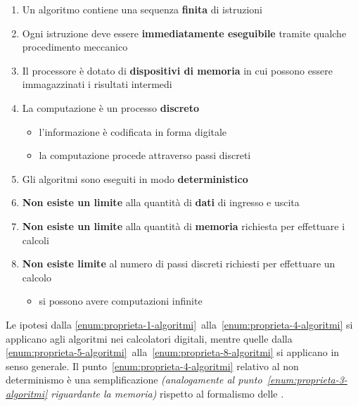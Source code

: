 \documentclass[italian, 10pt]{article}
\begin{document}
\begin{enumerate}[label=\Alph*), ref=(\Alph*)]
  \item \label{enum:proprieta-1-algoritmi} Un algoritmo contiene una sequenza \textbf{finita} di istruzioni
  \item Ogni istruzione deve essere \textbf{immediatamente eseguibile} tramite qualche procedimento meccanico
  \item  \label{enum:proprieta-3-algoritmi} Il processore è dotato di \textbf{dispositivi di memoria} in cui possono essere immagazzinati i risultati intermedi
  \item \label{enum:proprieta-4-algoritmi} La computazione è un processo \textbf{discreto}
        \begin{itemize}[label=\(\rightarrow\)]
          \item l'informazione è codificata in forma digitale
          \item la computazione procede attraverso passi discreti
        \end{itemize}
  \item \label{enum:proprieta-5-algoritmi} Gli algoritmi sono eseguiti in modo \textbf{deterministico}
  \item \label{enum:proprieta-6-algoritmi} \textbf{Non esiste un limite} alla quantità di \textbf{dati} di ingresso e uscita
  \item \label{enum:proprieta-7-algoritmi} \textbf{Non esiste un limite} alla quantità di \textbf{memoria} richiesta per effettuare i calcoli
  \item \label{enum:proprieta-8-algoritmi} \textbf{Non esiste limite} al numero di passi discreti richiesti per effettuare un calcolo
        \begin{itemize}[label=\(\rightarrow\)]
          \item si possono avere computazioni infinite
        \end{itemize}
\end{enumerate}

Le ipotesi dalla \ref{enum:proprieta-1-algoritmi}~alla~\ref{enum:proprieta-4-algoritmi} si applicano agli algoritmi nei calcolatori digitali, mentre quelle dalla \ref{enum:proprieta-5-algoritmi}~alla~\ref{enum:proprieta-8-algoritmi} si applicano in senso generale.
Il punto~\ref{enum:proprieta-4-algoritmi} relativo al non determinismo è una semplificazione \textit{(analogamente al punto~\ref{enum:proprieta-3-algoritmi} riguardante la memoria)} rispetto al formalismo delle \TM.
\end{document}
